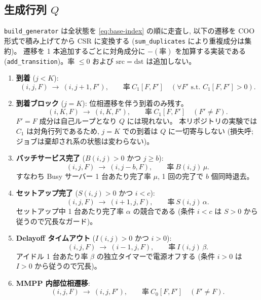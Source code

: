 \documentclass[a4paper,11pt]{article}
\newcommand{\code}[1]{\texttt{#1}}
\begin{document}
\subsection{生成行列 $Q$}

\code{build\_generator} は全状態を \eqref{eq:base-index} の順に走査し,
以下の遷移を COO 形式で積み上げてから CSR に変換する
(\code{sum\_duplicates} により重複成分は集約)。
遷移を 1 本追加するごとに対角成分に $-(\text{率})$ を加算する実装である
(\code{add\_transition})。率 $\le 0$ および $\mathrm{src}=\mathrm{dst}$ は追加しない。

\begin{enumerate}
\item \textbf{到着} ($j<K$):
  \begin{equation}
    (i,j,F)\ \longrightarrow\ (i,j+1,F'),\qquad \text{率}\ C_1[F,F']
    \quad (\forall F' \text{ s.t. } C_1[F,F']>0).
  \end{equation}
\item \textbf{到着ブロック} ($j=K$): 位相遷移を伴う到着のみ残す。
  \begin{equation}
    (i,K,F)\ \longrightarrow\ (i,K,F'),\qquad \text{率}\ C_1[F,F']
    \quad (F'\ne F).
  \end{equation}
  $F'=F$ 成分は自己ループとなり $Q$ には現れない。
  本リポジトリの実験では $C_1$ は対角行列であるため, $j=K$ での到着は
  $Q$ に一切寄与しない (損失呼; ジョブは棄却され系の状態は変わらない)。
\item \textbf{バッチサービス完了} ($B(i,j)>0$ かつ $j\ge b$):
  \begin{equation}
    (i,j,F)\ \longrightarrow\ (i,j-b,F),\qquad \text{率}\ B(i,j)\,\mu .
  \end{equation}
  すなわち Busy サーバー 1 台あたり完了率 $\mu$, 1 回の完了で $b$ 個同時退去。
\item \textbf{セットアップ完了} ($S(i,j)>0$ かつ $i<c$):
  \begin{equation}
    (i,j,F)\ \longrightarrow\ (i+1,j,F),\qquad \text{率}\ S(i,j)\,\alpha .
  \end{equation}
  セットアップ中 1 台あたり完了率 $\alpha$ の競合である
  (条件 $i<c$ は $S>0$ から従うので冗長なガード)。
\item \textbf{Delayoff タイムアウト} ($I(i,j)>0$ かつ $i>0$):
  \begin{equation}
    (i,j,F)\ \longrightarrow\ (i-1,j,F),\qquad \text{率}\ I(i,j)\,\beta .
  \end{equation}
  アイドル 1 台あたり率 $\beta$ の独立タイマーで電源オフする
  (条件 $i>0$ は $I>0$ から従うので冗長)。
\item \textbf{MMPP 内部位相遷移}:
  \begin{equation}
    (i,j,F)\ \longrightarrow\ (i,j,F'),\qquad \text{率}\ C_0[F,F']\quad (F'\ne F).
  \end{equation}
\end{enumerate}
\end{document}
